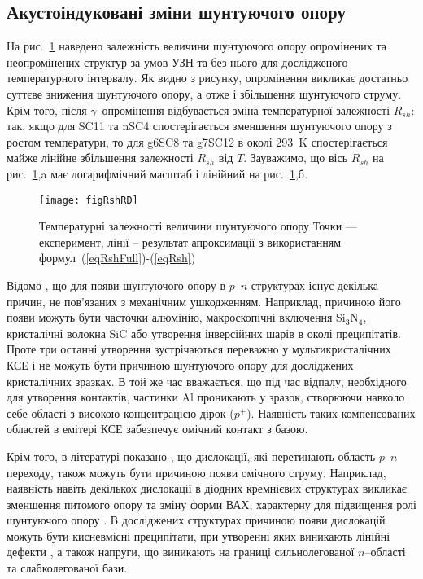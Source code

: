 \subsection{Акустоіндуковані зміни шунтуючого опору\label{sbRsh}}

На рис.~\ref{figRshRD} наведено залежність величини шунтуючого опору опромінених та неопромінених структур
за умов УЗН та без нього для дослідженого температурного інтервалу.
Як видно з рисунку, опромінення викликає достатньо суттєве зниження шунтуючого опору, а отже
і збільшення шунтуючого струму.
Крім того, після $\gamma$--опромінення відбувається зміна температурної залежності $R_{sh}$:
так, якщо для SC11 та nSC4 спостерігається зменшення шунтуючого опору з ростом температури,
то для g6SC8 та g7SC12 в околі 293~K спостерігається майже лінійне збільшення залежності
$R_{sh}$ від $T$.
Зауважимо, що вісь $R_{sh}$ на рис.~\ref{figRshRD},a має логарифмічний масштаб і лінійний на  рис.~\ref{figRshRD},б.


\begin{figure}
\center
\texttt{[image: figRshRD]}
\caption{\label{figRshRD}
Температурні залежності величини шунтуючого опору
\FigCaptionSSCRD
Точки --- експеримент,
лінії -- результат апроксимації з використанням формул~(\ref{eqRshFull})-(\ref{eqRsh})
}%
\end{figure}

Відомо \cite{Rsh:Breitenstein,RshMet,Breitenstein2013}, що для появи шунтуючого опору в $p$--$n$ структурах існує декілька причин, не
пов'язаних з механічним ушкодженням.
Наприклад, причиною його появи можуть бути часточки алюмінію, макроскопічні включення Si$_3$N$_4$, кристалічні волокна SiC або утворення інверсійних шарів
в околі преципітатів.
Проте три  останні утворення зустрічаються переважно у мультикристалічних КСЕ \cite{Rsh:Breitenstein,Breitenstein2013} і не можуть
бути причиною шунтуючого опору для досліджених кристалічних зразках.
В той же час вважається, що під час відпалу, необхідного для утворення контактів, частинки Al проникають у зразок,
створюючи навколо себе області з високою концентрацією дірок ($p^+$).
Наявність таких компенсованих областей в емітері КСЕ  забезпечує омічний контакт з базою.

Крім того, в літературі показано \cite{Rsh:Breitenstein,TAT:Gopal,Rsh:Baker,Si:dislIV},
що дислокації, які перетинають область $p$--$n$ переходу, також можуть бути причиною появи омічного струму.
Наприклад, наявність навіть декількох дислокації в діодних кремнієвих структурах викликає зменшення питомого опору
та зміну форми ВАХ, характерну для підвищення ролі шунтуючого опору \cite{Si:dislIV}.
В досліджених структурах причиною появи дислокацій можуть бути кисневмісні преципітати, при утворенні яких
виникають лінійні дефекти \cite{SiO:Hwang,SiO:Vanhell}, а також напруги, що виникають
на границі сильнолегованої $n$--області та слабколегованої бази.

